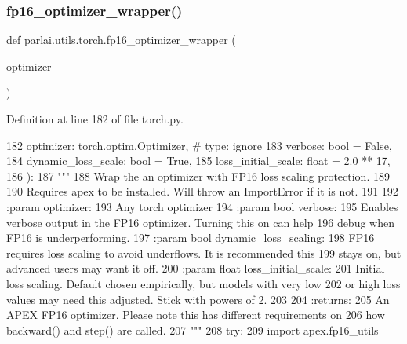 \subsubsection{\texorpdfstring{fp16\+\_\+optimizer\+\_\+wrapper()}{fp16\_optimizer\_wrapper()}}
{\footnotesize\ttfamily def parlai.\+utils.\+torch.\+fp16\+\_\+optimizer\+\_\+wrapper (\begin{DoxyParamCaption}\item[{}]{optimizer }\end{DoxyParamCaption})}



Definition at line 182 of file torch.\+py.


\begin{DoxyCode}
182     optimizer: torch.optim.Optimizer,  \textcolor{comment}{# type: ignore}
183     verbose: bool = \textcolor{keyword}{False},
184     dynamic\_loss\_scale: bool = \textcolor{keyword}{True},
185     loss\_initial\_scale: float = 2.0 ** 17,
186 ):
187     \textcolor{stringliteral}{"""}
188 \textcolor{stringliteral}{    Wrap the an optimizer with FP16 loss scaling protection.}
189 \textcolor{stringliteral}{}
190 \textcolor{stringliteral}{    Requires apex to be installed. Will throw an ImportError if it is not.}
191 \textcolor{stringliteral}{}
192 \textcolor{stringliteral}{    :param optimizer:}
193 \textcolor{stringliteral}{        Any torch optimizer}
194 \textcolor{stringliteral}{    :param bool verbose:}
195 \textcolor{stringliteral}{        Enables verbose output in the FP16 optimizer. Turning this on can help}
196 \textcolor{stringliteral}{        debug when FP16 is underperforming.}
197 \textcolor{stringliteral}{    :param bool dynamic\_loss\_scaling:}
198 \textcolor{stringliteral}{        FP16 requires loss scaling to avoid underflows. It is recommended this}
199 \textcolor{stringliteral}{        stays on, but advanced users may want it off.}
200 \textcolor{stringliteral}{    :param float loss\_initial\_scale:}
201 \textcolor{stringliteral}{        Initial loss scaling. Default chosen empirically, but models with very low}
202 \textcolor{stringliteral}{        or high loss values may need this adjusted. Stick with powers of 2.}
203 \textcolor{stringliteral}{}
204 \textcolor{stringliteral}{    :returns:}
205 \textcolor{stringliteral}{        An APEX FP16 optimizer. Please note this has different requirements on}
206 \textcolor{stringliteral}{        how backward() and step() are called.}
207 \textcolor{stringliteral}{    """}
208     \textcolor{keywordflow}{try}:
209         \textcolor{keyword}{import} apex.fp16\_utils

\end{DoxyCode}
